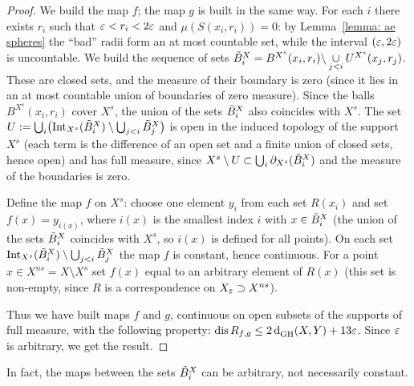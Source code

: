 \begin{proof}
    We build the map $f$; the map $g$ is built in the same way.
    For each $i$ there exists $r_i$ such that ${\varepsilon} < r_i < 2{\varepsilon}$ and $\mu(S(x_i,r_i)) = 0$: by Lemma~\ref{lemma: ae spheres} the ``bad'' radii form an at most countable set, while the interval $({\varepsilon}, 2{\varepsilon})$ is uncountable.
    We build the sequence of sets $\tilde{B}^X_i = B^{X^s}(x_i, r_i) \backslash \underset{j < i}{\cup}U^{X^s}(x_j, r_j)$.
    These are closed sets, and the measure of their boundary is zero (since it lies in an at most countable union of boundaries of zero measure).
    Since the balls $B^{X^s}(x_i, r_i)$ cover $X^s$, the union of the sets $\tilde{B}^X_i$ also coincides with $X^s$.
    The set $U := \bigcup_i \bigl(\operatorname{Int}_{X^s}(\tilde{B}^X_i) \setminus \bigcup_{j < i} \tilde{B}^X_j\bigr)$ is open in the induced topology of the support $X^s$ (each term is the difference of an open set and a finite union of closed sets, hence open) and has full measure, since $X^s \setminus U \subset \bigcup_i \partial_{X^s}(\tilde{B}^X_i)$ and the measure of the boundaries is zero.\par
    Define the map $f$ on $X^s$: choose one element $y_i$ from each set $R(x_i)$ and set $f(x) = y_{i(x)}$, where $i(x)$ is the smallest index $i$ with $x \in \tilde{B}^X_i$ (the union of the sets $\tilde{B}^X_i$ coincides with $X^s$, so $i(x)$ is defined for all points). On each set $\operatorname{Int}_{X^s}(\tilde{B}^X_i) \setminus \bigcup_{j < i}\tilde{B}^X_j$ the map $f$ is constant, hence continuous.
    For a point $x \in X^{ns} = X \setminus X^s$ set $f(x)$ equal to an arbitrary element of $R(x)$ (this set is non-empty, since $R$ is a correspondence on $X_{\varepsilon} \supset X^{ns}$).

    Thus we have built maps $f$ and $g$, continuous on open subsets of the supports of full measure, with the following property: $\operatorname{dis} R_{f,g} \leq 2\operatorname{d}^{}_{\mathrm{GH}}(X,Y) + 13 {\varepsilon}$. Since ${\varepsilon}$ is arbitrary, we get the result.
  \end{proof}
  \begin{comm}
    In fact, the maps between the sets $\tilde{B}^X_i$ can be arbitrary, not necessarily constant.
  \end{comm}
  
